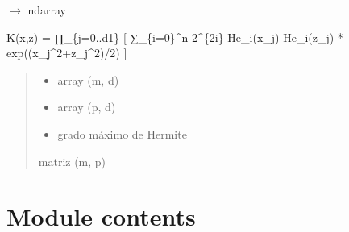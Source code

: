 \documentclass[letterpaper,10pt,english]{sphinxmanual}
\begin{document}
\begin{fulllineitems}
\label{\detokenize{Kernels:Kernels.custom.hermite_kernel_matrix}}
\pysigstartsignatures
\pysiglinewithargsret
{}
{\sphinxparamcomma {}\sphinxparamcomma {}}
{{ $\rightarrow$ ndarray}}
\pysigstopsignatures\begin{description}
\sphinxAtStartPar
K(x,z) = ∏\_\{j=0..d\sphinxhyphen{}1\} {[} ∑\_\{i=0\}\textasciicircum{}n 2\textasciicircum{}\{\sphinxhyphen{}2i\} He\_i(x\_j) He\_i(z\_j) * exp(\sphinxhyphen{}(x\_j\textasciicircum{}2+z\_j\textasciicircum{}2)/2) {]}

\end{description}
\begin{quote}\begin{description}
\begin{itemize}
\item {} 
\sphinxAtStartPar
{} \sphinxhyphen{}\sphinxhyphen{} array (m, d)

\item {} 
\sphinxAtStartPar
{} \sphinxhyphen{}\sphinxhyphen{} array (p, d)

\item {} 
\sphinxAtStartPar
{} \sphinxhyphen{}\sphinxhyphen{} grado máximo de Hermite

\end{itemize}

\sphinxAtStartPar
matriz (m, p)

\end{description}\end{quote}

\end{fulllineitems}



\section{Module contents}
\label{\detokenize{Kernels:module-Kernels}}\label{\detokenize{Kernels:module-contents}}
\sphinxstepscope
\end{document}
